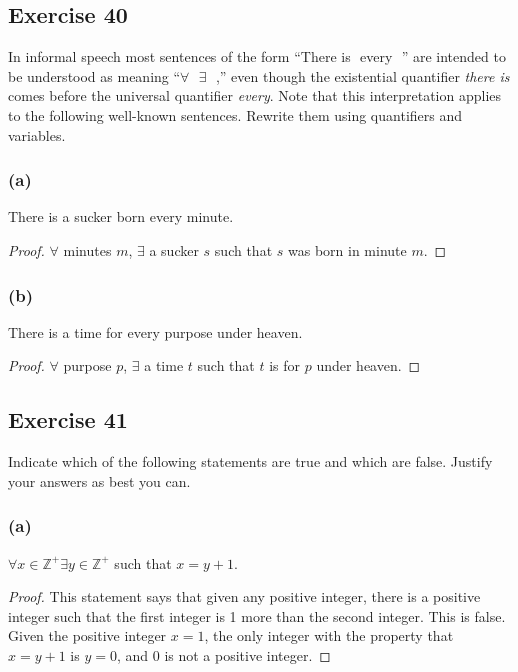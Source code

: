 \documentclass[14pt]{extarticle}
\newcommand{\fbl}{\underline{\hspace{1cm}}\,\,}
\newcommand{\Z}{\mathbb{Z}}
\newcommand{\fa}{\forall}
\newcommand{\te}{\exists}
\begin{document}
\subsection{Exercise 40}
In informal speech most sentences of the form “There is \fbl every \fbl” are intended to be understood as meaning “$\fa$ \fbl $\te$ \fbl,” even though the existential quantifier {\it there is} comes before the universal quantifier {\it every}. Note that this interpretation applies to the following well-known sentences. Rewrite them using quantifiers and variables.

\subsubsection{(a)}
There is a sucker born every minute.

\begin{proof}
$\fa$ minutes $m$, $\te$ a sucker $s$ such that $s$ was born in minute $m$.
\end{proof}

\subsubsection{(b)}
There is a time for every purpose under heaven.

\begin{proof}
$\fa$ purpose $p$, $\te$ a time $t$ such that $t$ is for $p$ under heaven.
\end{proof}

\subsection{Exercise 41}
Indicate which of the following statements are true and which are false. Justify your answers as best you can.

\subsubsection{(a)}
$\fa x \in \Z^+ \te y \in \Z^+$ such that $x = y + 1$.

\begin{proof}
This statement says that given any positive integer, there is a positive integer such that the first integer is 1 more than the second integer. This is false. Given the positive integer $x = 1$, the only integer with the property that $x = y + 1$ is $y = 0$, and 0 is not a positive integer.
\end{proof}
\end{document}
